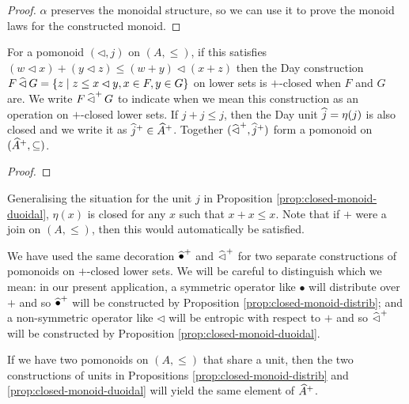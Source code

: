 \begin{proof}
  $\alpha$ preserves the monoidal structure, so we can use it to prove
  the monoid laws for the constructed monoid.

\end{proof}

\begin{proposition}\label{prop:closed-monoid-duoidal}
  For a pomonoid $(\lhd, j)$ on $(A, \leq)$, if this satisfies
  $(w \lhd x) + (y \lhd z) \leq (w + y) \lhd (x + z)$ then the Day
  construction
  $F \mathop{\widehat{\lhd}} G = \{ z \mid z \leq x \lhd y, x \in F, y \in G \}$ on
  lower sets is $+$-closed when $F$ and $G$ are. We write
  $F \mathop{\widehat{\lhd}^+} G$ to indicate when we mean this construction as
  an operation on $+$-closed lower sets. If $j + j \leq j$, then the
  Day unit $\mathop{\widehat{j}} = \eta(j)$ is also closed and we write it as
  $\mathop{\widehat{j}^+} \in \widehat{A}^+$. Together
  $(\mathop{\widehat{\lhd}^+}, \mathop{\widehat{j}^+})$ form a pomonoid on
  $(\widehat{A}^+, \subseteq)$.
\end{proposition}

\begin{proof}
\end{proof}

\begin{remark}
  Generalising the situation for the unit $j$ in Proposition
  \ref{prop:closed-monoid-duoidal}, $\eta(x)$ is closed for any $x$
  such that $x + x \leq x$. Note that if $+$ were a join on
  $(A, \leq)$, then this would automatically be satisfied.
\end{remark}

\begin{remark}
  We have used the same decoration $\mathop{\widehat{\bullet}^+}$ and
  $\mathop{\widehat{\lhd}^+}$ for two separate constructions of pomonoids on
  $+$-closed lower sets. We will be careful to distinguish which we
  mean: in our present application, a symmetric operator like
  $\bullet$ will distribute over $+$ and so $\mathop{\widehat{\bullet}^+}$ will
  be constructed by Proposition \ref{prop:closed-monoid-distrib}; and
  a non-symmetric operator like $\lhd$ will be entropic with respect
  to $+$ and so $\mathop{\widehat{\lhd}^+}$ will be constructed by Proposition
  \ref{prop:closed-monoid-duoidal}.
\end{remark}

\begin{remark}
  If we have two pomonoids on $(A, \leq)$ that share a unit, then the
  two constructions of units in Propositions
  \ref{prop:closed-monoid-distrib} and
  \ref{prop:closed-monoid-duoidal} will yield the same element of
  $\widehat{A}^+$.
\end{remark}

